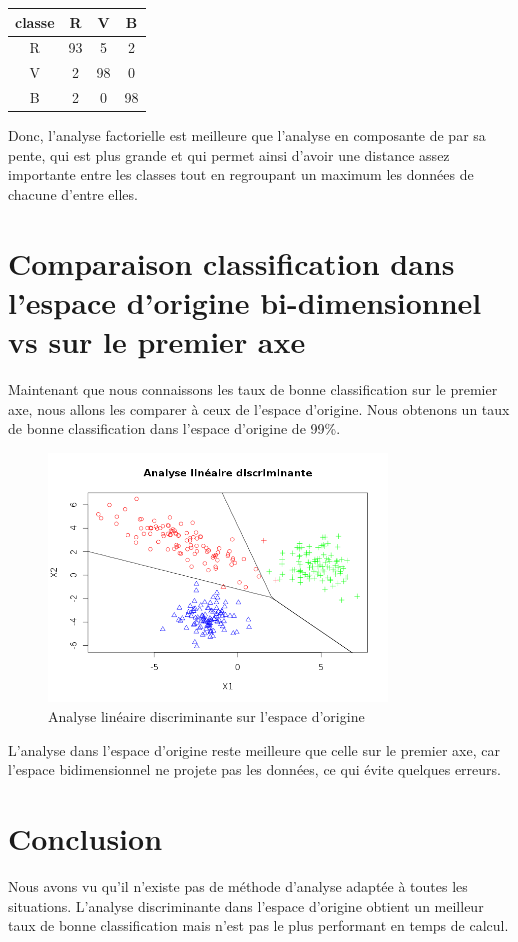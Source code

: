 \documentclass[a4paper,11pt]{article}
\begin{document}
  \begin{center}
  \begin{tabular}{|c|c|c|c|}
   \hline
   classe & R & V & B\\
   \hline
   R & 93 & 5 & 2 \\
   \hline
   V & 2 & 98 & 0 \\
   \hline
   B & 2 & 0 & 98 \\
   \hline
  \end{tabular}
  \end{center}
  
  Donc, l'analyse factorielle est meilleure que l'analyse en composante de par sa pente, qui est plus
  grande et qui permet ainsi d'avoir une distance assez importante entre les classes tout en
  regroupant un maximum les données de chacune d'entre elles.
  
  \section{Comparaison classification dans l'espace d'origine bi-dimensionnel vs sur le premier axe}
  Maintenant que nous connaissons les taux de bonne classification sur le premier axe, nous allons
  les comparer à ceux de l'espace d'origine. Nous obtenons un taux de bonne classification dans l'espace
  d'origine de 99\%.
  
   \begin{figure}[H]
    \center
   \includegraphics[width=9cm]{analyse_lin_test.png}
    \caption{Analyse linéaire discriminante sur l'espace d'origine}
  \end{figure}
  
  L'analyse dans l'espace d'origine reste meilleure que celle sur le premier axe, car l'espace bidimensionnel
  ne projete pas les données, ce qui évite quelques erreurs.
  
  \section{Conclusion}
  Nous avons vu qu'il n'existe pas de méthode d'analyse adaptée à toutes les situations. L'analyse discriminante dans 
  l'espace d'origine obtient un meilleur taux de bonne classification mais n'est pas le plus performant en temps
  de calcul.
  
\end{document}
